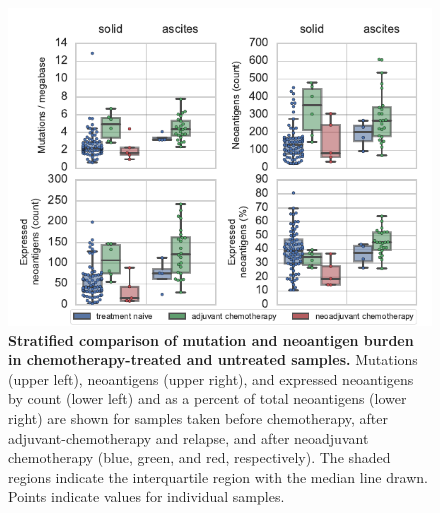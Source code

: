\begin{figure}
\centering
\includegraphics[scale=1.0]{figures/counts.pdf}
\caption{\textbf{Stratified comparison of mutation and neoantigen burden in chemotherapy-treated and untreated samples.} Mutations (upper left), neoantigens (upper right), and expressed neoantigens by count (lower left) and as a percent of total neoantigens (lower right) are shown for samples taken before chemotherapy, after adjuvant-chemotherapy and relapse, and after neoadjuvant chemotherapy (blue, green, and red, respectively). The shaded regions indicate the interquartile region with the median line drawn. Points indicate values for individual samples.}
\label{fig:counts}
\end{figure}


